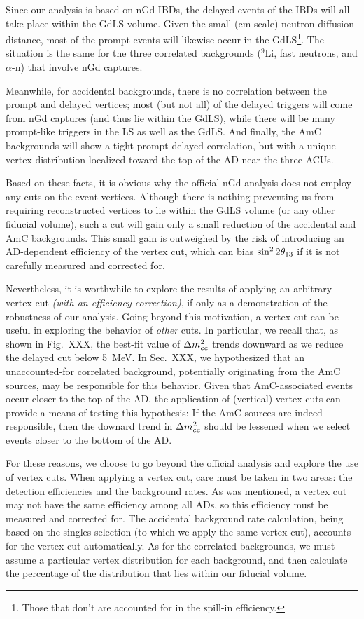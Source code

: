 \documentclass[../thesis.tex]{subfiles}
\begin{document}
Since our analysis is based on nGd IBDs, the delayed events of the IBDs will all take place within the GdLS volume. Given the small (cm-scale) neutron diffusion distance, most of the prompt events will likewise occur in the GdLS\footnote{Those that don't are accounted for in the spill-in efficiency.}. The situation is the same for the three correlated backgrounds ($^9$Li, fast neutrons, and $\alpha$-n) that involve nGd captures.

Meanwhile, for accidental backgrounds, there is no correlation between the prompt and delayed vertices; most (but not all) of the delayed triggers will come from nGd captures (and thus lie within the GdLS), while there will be many prompt-like triggers in the LS as well as the GdLS. And finally, the AmC backgrounds will show a tight prompt-delayed correlation, but with a unique vertex distribution localized toward the top of the AD near the three ACUs.

Based on these facts, it is obvious why the official nGd analysis does not employ any cuts on the event vertices. Although there is nothing preventing us from requiring reconstructed vertices to lie within the GdLS volume (or any other fiducial volume), such a cut will gain only a small reduction of the accidental and AmC backgrounds. This small gain is outweighed by the risk of introducing an AD-dependent efficiency of the vertex cut, which can bias $\sin^2 2\theta_{13}$ if it is not carefully measured and corrected for.

Nevertheless, it is worthwhile to explore the results of applying an arbitrary vertex cut \emph{(with an efficiency correction)}, if only as a demonstration of the robustness of our analysis. Going beyond this motivation, a vertex cut can be useful in exploring the behavior of \emph{other} cuts. In particular, we recall that, as shown in Fig.~XXX, the best-fit value of $\Delta m^2_{ee}$ trends downward as we reduce the delayed cut below 5~MeV. In Sec.~XXX, we hypothesized that an unaccounted-for correlated background, potentially originating from the AmC sources, may be responsible for this behavior. Given that AmC-associated events occur closer to the top of the AD, the application of (vertical) vertex cuts can provide a means of testing this hypothesis: If the AmC sources are indeed responsible, then the downard trend in $\Delta m^2_{ee}$ should be lessened when we select events closer to the bottom of the AD\@.

For these reasons, we choose to go beyond the official analysis and explore the use of vertex cuts. When applying a vertex cut, care must be taken in two areas: the detection efficiencies and the background rates. As was mentioned, a vertex cut may not have the same efficiency among all ADs, so this efficiency must be measured and corrected for. The accidental background rate calculation, being based on the singles selection (to which we apply the same vertex cut), accounts for the vertex cut automatically. As for the correlated backgrounds, we must assume a particular vertex distribution for each background, and then calculate the percentage of the distribution that lies within our fiducial volume.
\end{document}
